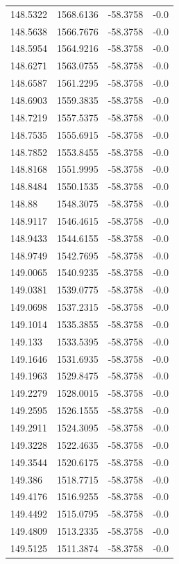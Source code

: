 \begin{table}[H]
\begin{tabular}{llll}
148.5322 & 1568.6136 & -58.3758 & -0.0 \\
148.5638 & 1566.7676 & -58.3758 & -0.0 \\
148.5954 & 1564.9216 & -58.3758 & -0.0 \\
148.6271 & 1563.0755 & -58.3758 & -0.0 \\
148.6587 & 1561.2295 & -58.3758 & -0.0 \\
148.6903 & 1559.3835 & -58.3758 & -0.0 \\
148.7219 & 1557.5375 & -58.3758 & -0.0 \\
148.7535 & 1555.6915 & -58.3758 & -0.0 \\
148.7852 & 1553.8455 & -58.3758 & -0.0 \\
148.8168 & 1551.9995 & -58.3758 & -0.0 \\
148.8484 & 1550.1535 & -58.3758 & -0.0 \\
148.88 & 1548.3075 & -58.3758 & -0.0 \\
148.9117 & 1546.4615 & -58.3758 & -0.0 \\
148.9433 & 1544.6155 & -58.3758 & -0.0 \\
148.9749 & 1542.7695 & -58.3758 & -0.0 \\
149.0065 & 1540.9235 & -58.3758 & -0.0 \\
149.0381 & 1539.0775 & -58.3758 & -0.0 \\
149.0698 & 1537.2315 & -58.3758 & -0.0 \\
149.1014 & 1535.3855 & -58.3758 & -0.0 \\
149.133 & 1533.5395 & -58.3758 & -0.0 \\
149.1646 & 1531.6935 & -58.3758 & -0.0 \\
149.1963 & 1529.8475 & -58.3758 & -0.0 \\
149.2279 & 1528.0015 & -58.3758 & -0.0 \\
149.2595 & 1526.1555 & -58.3758 & -0.0 \\
149.2911 & 1524.3095 & -58.3758 & -0.0 \\
149.3228 & 1522.4635 & -58.3758 & -0.0 \\
149.3544 & 1520.6175 & -58.3758 & -0.0 \\
149.386 & 1518.7715 & -58.3758 & -0.0 \\
149.4176 & 1516.9255 & -58.3758 & -0.0 \\
149.4492 & 1515.0795 & -58.3758 & -0.0 \\
149.4809 & 1513.2335 & -58.3758 & -0.0 \\
149.5125 & 1511.3874 & -58.3758 & -0.0 \\

\end{tabular}
\end{table}
